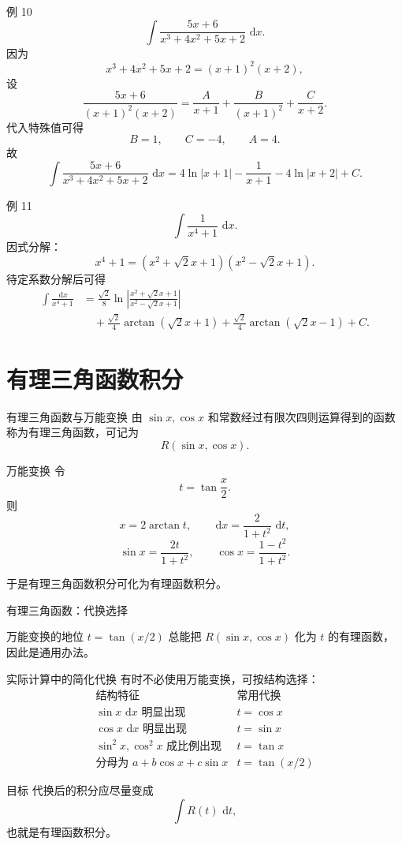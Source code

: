 \documentclass[aspectratio=169,10pt]{ctexbeamer}
\newcommand{\dd}{\,\mathrm{d}}
\begin{document}
\begin{frame}[t]{例 10}
\small
\[
  \int\frac{5x+6}{x^3+4x^2+5x+2}\,\dd x.
\]
因为
\[
  x^3+4x^2+5x+2=(x+1)^2(x+2),
\]
设
\[
  \frac{5x+6}{(x+1)^2(x+2)}
  =\frac{A}{x+1}+\frac{B}{(x+1)^2}+\frac{C}{x+2}.
\]
代入特殊值可得
\[
  B=1,\qquad C=-4,\qquad A=4.
\]
故
\[
\boxed{
\int\frac{5x+6}{x^3+4x^2+5x+2}\,\dd x
=4\ln|x+1|-\frac1{x+1}-4\ln|x+2|+C.}
\]
\end{frame}

\begin{frame}[t]{例 11}
\small
\[
  \int\frac{1}{x^4+1}\,\dd x.
\]
因式分解：
\[
  x^4+1=(x^2+\sqrt2x+1)(x^2-\sqrt2x+1).
\]
待定系数分解后可得
\[
\boxed{
\begin{aligned}
\int\frac{\dd x}{x^4+1}
&=\frac{\sqrt2}{8}
\ln\left|\frac{x^2+\sqrt2x+1}{x^2-\sqrt2x+1}\right|\\
&\quad+\frac{\sqrt2}{4}\arctan(\sqrt2x+1)
+\frac{\sqrt2}{4}\arctan(\sqrt2x-1)+C.
\end{aligned}}
\]
\end{frame}

\section{有理三角函数积分}

\begin{frame}[t]{有理三角函数与万能变换}
\small
由 $\sin x,\cos x$ 和常数经过有限次四则运算得到的函数称为有理三角函数，可记为
\[
  R(\sin x,\cos x).
\]

\begin{block}{万能变换}
令
\[
  t=\tan\frac{x}{2}.
\]
则
\[
  x=2\arctan t,\qquad
  \dd x=\frac{2}{1+t^2}\,\dd t,
\]
\[
  \sin x=\frac{2t}{1+t^2},\qquad
  \cos x=\frac{1-t^2}{1+t^2}.
\]
\end{block}
于是有理三角函数积分可化为有理函数积分。
\end{frame}

\begin{frame}[t,shrink=5]{有理三角函数：代换选择}
\footnotesize
\begin{block}{万能变换的地位}
$t=\tan(x/2)$ 总能把 $R(\sin x,\cos x)$ 化为 $t$ 的有理函数，因此是通用办法。
\end{block}

\begin{block}{实际计算中的简化代换}
有时不必使用万能变换，可按结构选择：
\[
\begin{array}{c|c}
\text{结构特征} & \text{常用代换}\\ \hline
\sin x\,\dd x \text{ 明显出现} & t=\cos x\\
\cos x\,\dd x \text{ 明显出现} & t=\sin x\\
\sin^2x,\cos^2x \text{ 成比例出现} & t=\tan x\\
\text{分母为 } a+b\cos x+c\sin x & t=\tan(x/2)
\end{array}
\]
\end{block}

\begin{alertblock}{目标}
代换后的积分应尽量变成
\[
  \int R(t)\,\dd t,
\]
也就是有理函数积分。
\end{alertblock}
\end{frame}
\end{document}

